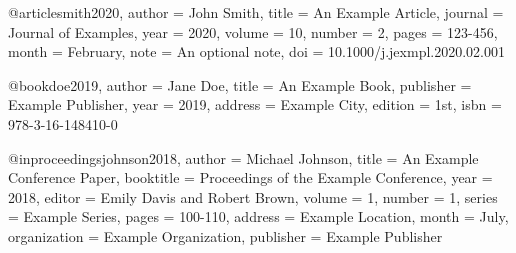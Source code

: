 @article{smith2020,
    author  = {John Smith},
    title   = {An Example Article},
    journal = {Journal of Examples},
    year    = {2020},
    volume  = {10},
    number  = {2},
    pages   = {123-456},
    month   = {February},
    note    = {An optional note},
    doi     = {10.1000/j.jexmpl.2020.02.001}
}

@book{doe2019,
    author    = {Jane Doe},
    title     = {An Example Book},
    publisher = {Example Publisher},
    year      = {2019},
    address   = {Example City},
    edition   = {1st},
    isbn      = {978-3-16-148410-0}
}

@inproceedings{johnson2018,
    author    = {Michael Johnson},
    title     = {An Example Conference Paper},
    booktitle = {Proceedings of the Example Conference},
    year      = {2018},
    editor    = {Emily Davis and Robert Brown},
    volume    = {1},
    number    = {1},
    series    = {Example Series},
    pages     = {100-110},
    address   = {Example Location},
    month     = {July},
    organization = {Example Organization},
    publisher = {Example Publisher}
}